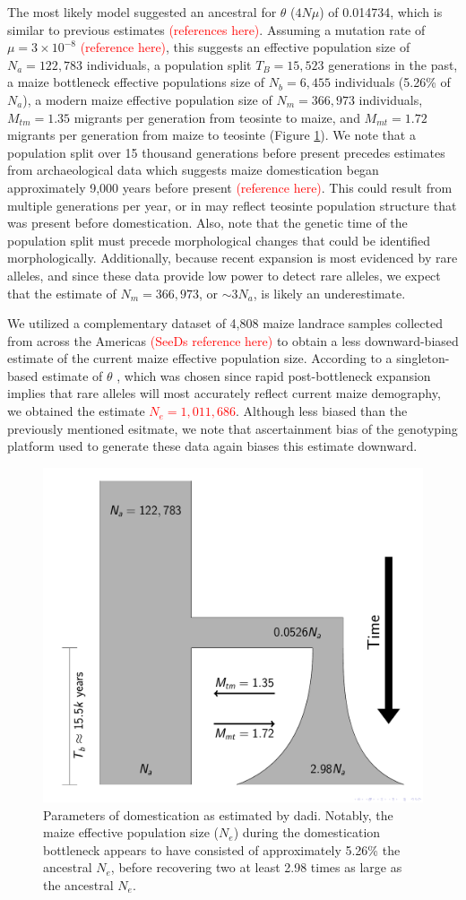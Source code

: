 \documentclass{pnastwo}
\begin{document}
\begin{article}
The most likely model suggested an ancestral for $\theta$ ($4N\mu$) of
0.014734, which is similar to previous estimates
\textcolor{red}{(references here)}. Assuming a mutation rate of $\mu =
3 \times 10^{-8}$ \textcolor{red}{(reference here)}, this suggests an effective
population size of $N_a = 122,783$ individuals, a population split
$T_B = 15,523$ generations in the past, a maize bottleneck
effective populations size of $N_b = 6,455$ individuals (5.26\% of
$N_a$), a modern maize effective population size of $N_m = 366,973$
individuals, $M_{tm} = 1.35$ migrants per generation from teosinte to
maize, and $M_{mt} = 1.72$ migrants per generation from maize to
teosinte (Figure \ref{bottleneck}). We note that a population
split over 15 thousand generations before present precedes estimates
from
archaeological data which suggests maize domestication began
approximately 9,000 years before present \textcolor{red}{(reference
  here)}. This could result from multiple generations per year, or in
may reflect teosinte population structure that was present before
domestication. Also, note that the genetic time of the population
split must precede morphological changes that could be identified
morphologically.   Additionally, because recent expansion is
most evidenced by rare alleles, and since these data provide low
power to detect rare alleles, we expect that the estimate of  $N_m =
366,973$, or $\sim 3N_a$, is likely an underestimate. 

We utilized a complementary dataset of 4,808 maize landrace samples collected
from across the Americas \textcolor{red}{(SeeDs reference here)} to
obtain a less downward-biased estimate of the current maize effective
population size. According to a singleton-based estimate of $\theta$
\cite{fu1993}, which was chosen since rapid post-bottleneck expansion
implies that rare alleles will most accurately reflect current maize
demography, we obtained the estimate \textcolor{red}{$N_e =
  1,011,686$}. Although less biased than the previously mentioned
esitmate, we note that ascertainment bias of the
genotyping platform used to generate these data again biases this
estimate downward.


\begin{figure}[b]
\centering
\includegraphics[width=.4\textwidth]{FigsAndFiles/DomesticationModel/domesticationModel.pdf}
\caption{Parameters of domestication as estimated by dadi. Notably,
  the maize effective population size ($N_e$) during the domestication
  bottleneck appears to have consisted of approximately 5.26\%
  the ancestral $N_e$, before recovering two at least 2.98
  times as large as the ancestral $N_e$.}
\label{bottleneck}
\end{figure}



\end{article}
\end{document}
